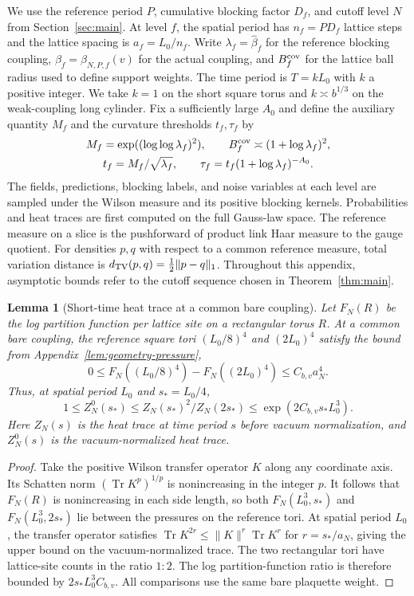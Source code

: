 \documentclass[11pt,a4paper]{article}
\newtheorem{lemma}[theorem]{Lemma}
\numberwithin{equation}{section}
\begin{document}
We use the reference period \(P\), cumulative blocking factor \(D_f\), and cutoff level \(N\) from Section~\ref{sec:main}. At level \(f\), the spatial period has \(n_f=PD_f\) lattice steps and the lattice spacing is \(a_f=L_0/n_f\). Write \(\lambda_f=\widehat\beta_f\) for the reference blocking coupling, \(\beta_f=\beta_{N,P,f}(v)\) for the actual coupling, and \(B_f^{\rm cov}\) for the lattice ball radius used to define support weights. The time period is \(T=kL_0\) with \(k\) a positive integer. We take \(k=1\) on the short square torus and \(k\asymp b^{1/3}\) on the weak-coupling long cylinder. Fix a sufficiently large \(A_0\) and define the auxiliary quantity \(M_f\) and the curvature thresholds \(t_f,\tau_f\) by
\[
 \begin{gathered}
 M_f=\exp((\log\log\lambda_f)^2),\qquad B_f^{\rm cov}\asymp(1+\log\lambda_f)^2,\\
 t_f=M_f/\sqrt{\lambda_f},\qquad \tau_f=t_f(1+\log\lambda_f)^{-A_0}.
 \end{gathered}
\]
The fields, predictions, blocking labels, and noise variables at each level are sampled under the Wilson measure and its positive blocking kernels. Probabilities and heat traces are first computed on the full Gauss-law space. The reference measure on a slice is the pushforward of product link Haar measure to the gauge quotient. For densities \(p,q\) with respect to a common reference measure, total variation distance is \(d_{\rm TV}(p,q)=\tfrac12\|p-q\|_1\). Throughout this appendix, asymptotic bounds refer to the cutoff sequence chosen in Theorem~\ref{thm:main}.

\begin{lemma}[Short-time heat trace at a common bare coupling]\label{cam-bound-pressure}
Let \(F_N(R)\) be the log partition function per lattice site on a rectangular torus \(R\). At a common bare coupling, the reference square tori \((L_0/8)^4\) and \((2L_0)^4\) satisfy the bound from Appendix~\ref{lem:geometry-pressure},
\[
 0\le F_N((L_0/8)^4)-F_N((2L_0)^4)\le C_{b,v}a_N^4 .
\]
Thus, at spatial period \(L_0\) and \(s_*=L_0/4\),
\[
 1\le Z_N^0(s_*)\le
 Z_N(s_*)^2/Z_N(2s_*)\le \exp(2C_{b,v}s_*L_0^3).
\]
Here \(Z_N(s)\) is the heat trace at time period \(s\) before vacuum normalization, and \(Z_N^0(s)\) is the vacuum-normalized heat trace.
\end{lemma}
\begin{proof}
Take the positive Wilson transfer operator \(K\) along any coordinate axis. Its Schatten norm \((\operatorname{Tr}K^p)^{1/p}\) is nonincreasing in the integer \(p\). It follows that \(F_N(R)\) is nonincreasing in each side length, so both \(F_N(L_0^3,s_*)\) and \(F_N(L_0^3,2s_*)\) lie between the pressures on the reference tori. At spatial period \(L_0\), the transfer operator satisfies \(\operatorname{Tr}K^{2r}\le\|K\|^r\operatorname{Tr}K^r\) for \(r=s_*/a_N\), giving the upper bound on the vacuum-normalized trace. The two rectangular tori have lattice-site counts in the ratio \(1:2\). The log partition-function ratio is therefore bounded by \(2s_*L_0^3C_{b,v}\). All comparisons use the same bare plaquette weight.
\end{proof}
\end{document}
